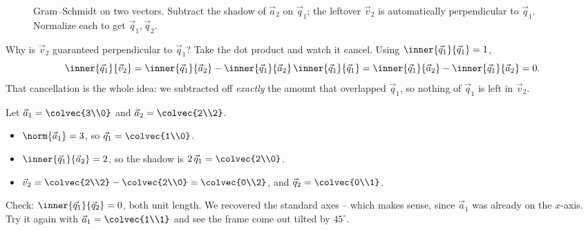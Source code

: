 \begin{figure}[H]
\centering
{}
\caption{Gram--Schmidt on two vectors. Subtract the shadow of $\vec{a}_2$ on
$\vec{q}_1$; the leftover $\vec{v}_2$ is automatically perpendicular to $\vec{q}_1$.
Normalize each to get $\vec{q}_1,\vec{q}_2$.}
\label{ch20:gs2}
\end{figure}

Why is $\vec{v}_2$ guaranteed perpendicular to $\vec{q}_1$? Take the dot product and
watch it cancel. Using $\inner{\vec{q}_1}{\vec{q}_1}=1$,
\[
  \inner{\vec{q}_1}{\vec{v}_2}
   = \inner{\vec{q}_1}{\vec{a}_2} - \inner{\vec{q}_1}{\vec{a}_2}\,\inner{\vec{q}_1}{\vec{q}_1}
   = \inner{\vec{q}_1}{\vec{a}_2} - \inner{\vec{q}_1}{\vec{a}_2}
   = 0.
\]
That cancellation is the whole idea: we subtracted off \emph{exactly} the amount that
overlapped $\vec{q}_1$, so nothing of $\vec{q}_1$ is left in $\vec{v}_2$.

\begin{labbox}
Let $\vec{a}_1=\colvec{3\\0}$ and $\vec{a}_2=\colvec{2\\2}$.
\begin{itemize}
  \item $\norm{\vec{a}_1}=3$, so $\vec{q}_1=\colvec{1\\0}$.
  \item $\inner{\vec{q}_1}{\vec{a}_2}=2$, so the shadow is $2\,\vec{q}_1=\colvec{2\\0}$.
  \item $\vec{v}_2=\colvec{2\\2}-\colvec{2\\0}=\colvec{0\\2}$, and
        $\vec{q}_2=\colvec{0\\1}$.
\end{itemize}
Check: $\inner{\vec{q}_1}{\vec{q}_2}=0$, both unit length. We recovered the standard
axes -- which makes sense, since $\vec{a}_1$ was already on the $x$-axis. Try it again
with $\vec{a}_1=\colvec{1\\1}$ and see the frame come out tilted by $45^\circ$.
\end{labbox}

